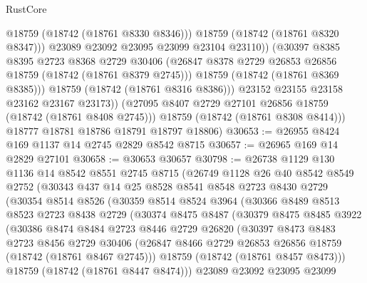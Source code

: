 \begin{lexlean}{RustCore}
\begin{coremodule}
                      @18759
                      (@18742 (@18761 @8330 @8346)))
                    @18759
                    (@18742 (@18761 @8320 @8347)))
                  @23089
                  @23092
                  @23095
                  @23099
                  @23104
                  @23110))
              (@30397
                @8385
                @8395
                @2723
                @8368
                @2729
                @30406
                (@26847 @8378 @2729 @26853 @26856 @18759 (@18742 (@18761 @8379 @2745)))
                @18759
                (@18742 (@18761 @8369 @8385)))
              @18759
              (@18742 (@18761 @8316 @8386)))
            @23152
            @23155
            @23158
            @23162
            @23167
            @23173))
        (@27095 @8407 @2729 @27101 @26856 @18759 (@18742 (@18761 @8408 @2745)))
        @18759
        (@18742 (@18761 @8308 @8414)))
      @18777
      @18781
      @18786
      @18791
      @18797
      @18806)
@30653 := @26955 @8424 @169 @1137 @14 @2745 @2829 @8542 @8715
@30657 := @26965 @169 @14 @2829 @27101
@30658 := @30653 @30657
@30798 := @26738
    @1129
    @130
    @1136
    @14
    @8542
    @8551
    @2745
    @8715
    (@26749
      @1128
      @26
      @40
      @8542
      @8549
      @2752
      (@30343
        @437
        @14
        @25
        @8528
        @8541
        @8548
        @2723
        @8430
        @2729
        (@30354
          @8514
          @8526
          (@30359
            @8514
            @8524
            @3964
            (@30366
              @8489
              @8513
              @8523
              @2723
              @8438
              @2729
              (@30374
                @8475
                @8487
                (@30379
                  @8475
                  @8485
                  @3922
                  (@30386
                    @8474
                    @8484
                    @2723
                    @8446
                    @2729
                    @26820
                    (@30397
                      @8473
                      @8483
                      @2723
                      @8456
                      @2729
                      @30406
                      (@26847 @8466 @2729 @26853 @26856 @18759 (@18742 (@18761 @8467 @2745)))
                      @18759
                      (@18742 (@18761 @8457 @8473)))
                    @18759
                    (@18742 (@18761 @8447 @8474)))
                  @23089
                  @23092
                  @23095
                  @23099

\end{coremodule}
\end{lexlean}
